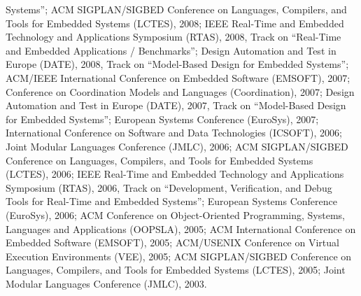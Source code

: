 {\begin{itemize}
Systems'';
ACM SIGPLAN/SIGBED Conference on Languages, Compilers, and Tools for Embedded Systems (LCTES), 2008;
IEEE Real-Time and Embedded Technology and Applications Symposium (RTAS), 2008, Track on ``Real-Time and Embedded Applications / Benchmarks'';
Design Automation and Test in Europe (DATE), 2008, Track on ``Model-Based Design for Embedded Systems'';
ACM/IEEE International Conference on Embedded Software (EMSOFT), 2007;
Conference on Coordination Models and Languages (Coordination), 2007;
Design Automation and Test in Europe (DATE), 2007, Track on ``Model-Based Design for Embedded Systems'';
European Systems Conference (EuroSys), 2007;
International Conference on Software and Data Technologies (ICSOFT), 2006;
Joint Modular Languages Conference (JMLC), 2006;
ACM SIGPLAN/SIGBED Conference on Languages, Compilers, and Tools for Embedded Systems (LCTES), 2006;
IEEE Real-Time and Embedded Technology and Applications Symposium (RTAS), 2006, Track on ``Development, Verification, and Debug Tools for Real-Time and Embedded Systems'';
European Systems Conference (EuroSys), 2006;
ACM Conference on Object-Oriented Programming, Systems, Languages and Applications (OOPSLA), 2005;
ACM International Conference on Embedded Software (EMSOFT), 2005;
ACM/USENIX Conference on Virtual Execution Environments (VEE), 2005;
ACM SIGPLAN/SIGBED Conference on Languages, Compilers, and Tools for Embedded Systems (LCTES), 2005;
Joint Modular Languages Conference (JMLC), 2003.
\end{itemize}
}



